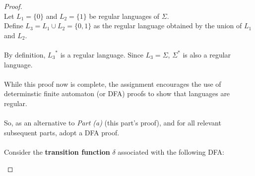 \documentclass[12pt]{article}
\begin{document}
\begin{proof}
\leavevmode\\
    Let $L_1 = \{0\}$ and $L_2 = \{1\}$ be regular languages of $\Sigma$. \\
    Define $L_3 = L_1 \cup L_2 = \{ 0, 1 \}$ as the regular language obtained by the union of $L_1$ and $L_2$. \\
    \\
    By definition, ${L_3}^*$ is a regular language. Since ${L_3} = \Sigma$, $\Sigma^*$ is also a regular language. \\
    \\
    While this proof now is complete, the assignment encourages the use of determinstic finite automaton (or DFA) proofs to show that languages are regular. \\
    \\
    So, as an alternative to \textit{Part (a)} (this part's proof), and for all relevant subsequent parts, adopt a DFA proof. \\
    \\
    Consider the \textbf{transition function} $\delta$ associated with the following DFA:
    \begin{center}
\end{center}
\end{proof}
\end{document}
